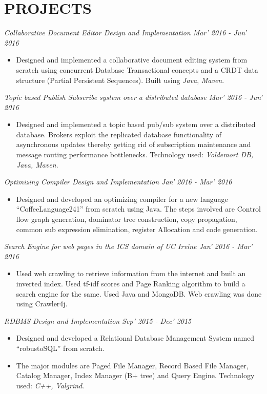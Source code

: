 \documentclass{article}
\begin{document}
\section*{PROJECTS}
\noindent
\textit{Collaborative Document Editor Design and Implementation \hfill Mar' 2016 - Jun' 2016}
\begin{itemize}
	\item Designed and implemented a collaborative document editing system from scratch using concurrent Database Transactional concepts and a CRDT data structure (Partial Persistent Sequences). Built using \textit{Java}, \textit{Maven}.
\end{itemize}
\textit{Topic based Publish Subscribe system over a distributed database \hfill Mar' 2016 - Jun' 2016}
\begin{itemize}
	\item Designed and implemented a topic based pub/sub system over a distributed database. Brokers exploit the replicated database functionality of asynchronous updates thereby getting rid of subscription maintenance and message routing performance bottlenecks. Technology used: \textit{Voldemort DB, Java, Maven}.
\end{itemize}
\textit{Optimizing Compiler Design and Implementation \hfill Jan' 2016 - Mar' 2016}
\begin{itemize}
	\item Designed and developed an optimizing compiler for a new language “CoffeeLanguage241” from scratch using Java. The steps involved are Control flow graph generation, dominator tree construction, copy propagation, common sub expression elimination, register Allocation and code generation.
\end{itemize}
\textit{Search Engine for web pages in the ICS domain of UC Irvine \hfill Jan' 2016 - Mar' 2016}
\begin{itemize}
	\item Used web crawling to retrieve information from the internet and built an inverted index. Used tf-idf scores and Page Ranking algorithm to build a search engine for the same. Used Java and MongoDB. Web crawling was done using Crawler4j.
\end{itemize}
\textit{RDBMS Design and Implementation \hfill Sep' 2015 - Dec' 2015}
\begin{itemize}
	\item Designed and developed a Relational Database Management System named “robustoSQL” from scratch.
	\item The major modules are Paged File Manager, Record Based File Manager, Catalog Manager, Index Manager (B+ tree) and Query Engine. Technology used: \textit{C++, Valgrind}.
\end{itemize}
\end{document}
